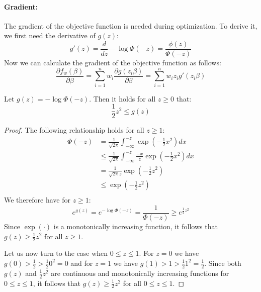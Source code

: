 \paragraph{Gradient:}
The gradient of the objective function is needed during optimization.
To derive it, we first need the derivative of $g(z)$:
\begin{equation*}
    g'(z) = \frac{d}{dz} - \log \Phi(-z) = \frac{\phi(z)}{\Phi(-z)}
\end{equation*}
Now we can calculate the gradient of the objective function as follows:
\begin{equation*}
    \frac{\partial f_w(\beta)}{\partial \beta} = 
    \sum_{i=1}^n w_i \frac{\partial g(z_i \beta)}{\partial \beta} =
    \sum_{i=1}^n w_i z_i g'(z_i \beta)
\end{equation*}

\begin{lemma}
    Let $g(z) = -\log \Phi(-z)$. Then it holds for all $z \geq 0$ that:
    $$
        \frac{1}{2} z^2 \leq g(z)
    $$
\end{lemma}
\begin{proof}
    The following relationship holds for all $z \geq 1$:
    \begin{align*} 
        \Phi(-z) & = \frac{1}{\sqrt{2 \pi}} \int_{-\infty}^{-z} \exp{ \left(-\frac{1}{2} x^2 \right)} dx                 \\
                 & \leq \frac{1}{\sqrt{2 \pi}} \int_{-\infty}^{-z} \frac{-x}{z} \exp{ \left(-\frac{1}{2} x^2 \right)} dx \\
                 & = \frac{1}{\sqrt{2 \pi} z} \exp{\left( -\frac{1}{2} z^2 \right)}                                      \\
                 & \leq \exp{\left( -\frac{1}{2} z^2 \right)}                                                            \\
    \end{align*}
    We therefore have for $z \geq 1$:
    $$
        e^{g(z)} = e^{-\log \Phi(-z)} = \frac{1}{\Phi(-z)} \geq e^{\frac{1}{2} z^2}
    $$
    Since $\exp( \cdot )$ is a monotonically increasing function,
    it follows that $g(z) \geq \frac{1}{2}z^2$ for all $z \geq 1$.
    
    \noindent{}Let us now turn to the case when $0 \leq z \leq 1$.
    For $z=0$ we have $g(0) > \frac{1}{2} > \frac{1}{2} 0^2 = 0$ and
    for $z=1$ we have $g(1) > 1 > \frac{1}{2} 1^2 = \frac{1}{2}$.
    Since both $g(z)$ and $\frac{1}{2} z^2$ are continuous and monotonically increasing 
    functions for $0 \leq z \leq 1$, it follows that 
    $g(z) \geq \frac{1}{2} z^2$ for all $0 \leq z \leq 1$.
\end{proof}

